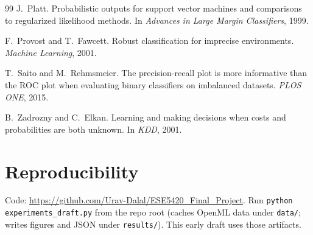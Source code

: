 \documentclass[10pt,twocolumn,letterpaper]{article}
\begin{document}
\begin{thebibliography}{99}
J.~Platt.
\newblock Probabilistic outputs for support vector machines and comparisons to regularized likelihood methods.
\newblock In \emph{Advances in Large Margin Classifiers}, 1999.

F.~Provost and T.~Fawcett.
\newblock Robust classification for imprecise environments.
\newblock \emph{Machine Learning}, 2001.

T.~Saito and M.~Rehmsmeier.
\newblock The precision-recall plot is more informative than the ROC plot when evaluating binary classifiers on imbalanced datasets.
\newblock \emph{PLOS ONE}, 2015.

B.~Zadrozny and C.~Elkan.
\newblock Learning and making decisions when costs and probabilities are both unknown.
\newblock In \emph{KDD}, 2001.
\end{thebibliography}

\section*{Reproducibility}
Code: \url{https://github.com/Urav-Dalal/ESE5420_Final_Project}.
Run \texttt{python experiments\_draft.py} from the repo root (caches OpenML data under \texttt{data/}; writes figures and JSON under \texttt{results/}).
This early draft uses those artifacts.
\end{document}
